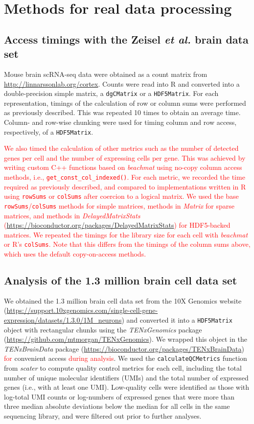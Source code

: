 \documentclass{article}
\newcommand{\beachmat}{\textit{beachmat}}
\newcommand{\code}[1]{\texttt{#1}}
\newcommand{\revised}[1]{\textcolor{red}{#1}}
\begin{document}
\section{Methods for real data processing}

\subsection{Access timings with the Zeisel \textit{et al.} brain data set}
Mouse brain scRNA-seq data \cite{zeisel2015brain} were obtained as a count matrix from \url{http://linnarssonlab.org/cortex}.
Counts were read into R and converted into a double-precision simple matrix, a \code{dgCMatrix} or a \code{HDF5Matrix}.
For each representation, timings of the calculation of row or column sums were performed as previously described.
This was repeated 10 times to obtain an average time.
Column- and row-wise chunking were used for timing column and row access, respectively, of a \code{HDF5Matrix}.

\revised{We also timed the calculation of other metrics such as the number of detected genes per cell and the number of expressing cells per gene.
This was achieved by writing custom C++ functions based on \beachmat{} using no-copy column access methods, i.e., \code{get\_const\_col\_indexed()}.
For each metric, we recorded the time required as previously described, and compared to implementations written in R using \code{rowSums} or \code{colSums} after coercion to a logical matrix.
We used the base \code{rowSums}/\code{colSums} methods for simple matrices, methods in \textit{Matrix} for sparse matrices, and methods in \textit{DelayedMatrixStats} (\url{https://bioconductor.org/packages/DelayedMatrixStats}) for HDF5-backed matrices.
We repeated the timings for the library size for each cell with \beachmat{} or R's \code{colSums}.
Note that this differs from the timings of the column sums above, which uses the default copy-on-access methods.}

\subsection{Analysis of the 1.3 million brain cell data set}
We obtained the 1.3 million brain cell data set from the 10X Genomics website (\url{https://support.10xgenomics.com/single-cell-gene-expression/datasets/1.3.0/1M_neurons})
and converted it into a \code{HDF5Matrix} object with rectangular chunks using the \textit{TENxGenomics} package (\url{https://github.com/mtmorgan/TENxGenomics}).
We wrapped this object in the \textit{TENxBrainData} package (\revised{\url{https://bioconductor.org/packages/TENxBrainData}}) \revised{for} convenient access \revised{during analysis}. 
We used the \code{calculateQCMetrics} function from \textit{scater} \cite{mccarthy2017scater} to compute quality control metrics for each cell,
including the total number of unique molecular identifiers (UMIs) and the total number of expressed genes (i.e., with at least one UMI).
Low-quality cells were identified as those with log-total UMI counts or log-numbers of expressed genes that were more than three median absolute deviations below the median for all cells in the same sequencing library, and were filtered out prior to further analyses.
\end{document}
